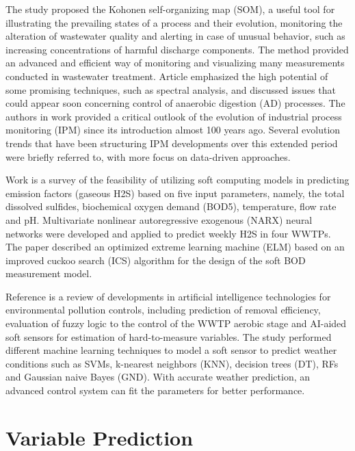 The study \cite{Liukkonen2013} proposed the Kohonen self-organizing map (SOM), a useful tool for illustrating the prevailing states of a process and their evolution, monitoring the alteration of wastewater quality and alerting in case of unusual behavior, such as increasing concentrations of harmful discharge components. The method provided an advanced and efficient way of monitoring and visualizing many measurements conducted in wastewater treatment. Article \cite{Jimenez2015} emphasized the high potential of some promising techniques, such as spectral analysis, and discussed issues that could appear soon concerning control of anaerobic digestion (AD) processes. The authors in work \cite{Reis2017} provided a critical outlook of the evolution of industrial process monitoring (IPM) since its introduction almost 100 years ago. Several evolution trends that have been structuring IPM developments over this extended period were briefly referred to, with more focus on data-driven approaches.

Work \cite{Zounemat-Kermani2019} is a survey of the feasibility of utilizing soft computing models in predicting emission factors (gaseous H2S) based on five input parameters, namely, the total dissolved sulfides, biochemical oxygen demand (BOD5), temperature, flow rate and pH. Multivariate nonlinear autoregressive exogenous (NARX) neural networks were developed and applied to predict weekly H2S in four WWTPs. The paper \cite{Yu2019} described an optimized extreme learning machine (ELM) based on an improved cuckoo search (ICS) algorithm for the design of the soft BOD measurement model.

Reference \cite{Ye2020} is a review of developments in artificial intelligence technologies for environmental pollution controls, including prediction of removal efficiency, evaluation of fuzzy logic to the control of the WWTP aerobic stage and AI-aided soft sensors for estimation of hard-to-measure variables. 
The study \cite{Hernandez-del-Olmo2019} performed different machine learning techniques to model a soft sensor to predict weather conditions such as SVMs, k-nearest neighbors (KNN), decision trees (DT), RFs and Gaussian naive Bayes (GND). With accurate weather prediction, an advanced control system can fit the parameters for better performance.

\section{Variable Prediction}
\label{s:RelatedWorks-variablePrediction}

